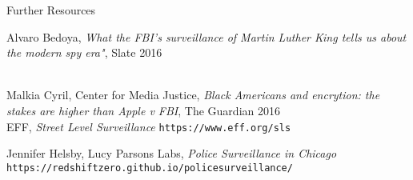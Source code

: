 \documentclass[newPxFont]{beamer}
\begin{document}
\begin{frame}{Further Resources}
  \begin{thebibliography}{10}
	\beamertemplatearticlebibitems
        Alvaro Bedoya, \textit{What the FBI's surveillance of Martin Luther King tells us about the modern spy era"}, Slate 2016 
        
\\
	\beamertemplatearticlebibitems
	Malkia Cyril, Center for Media Justice, \textit{Black Americans and encrytion: the stakes are higher than Apple v FBI}, The Guardian 2016
\\
	\beamertemplatearticlebibitems
	EFF, \textit{Street Level Surveillance}
	\newblock \texttt{https://www.eff.org/sls}

	\beamertemplatearticlebibitems
	Jennifer Helsby, Lucy Parsons Labs, \textit{Police Surveillance in Chicago}
	\newblock \texttt{https://redshiftzero.github.io/policesurveillance/}

  \end{thebibliography}
\end{frame}
\end{document}
